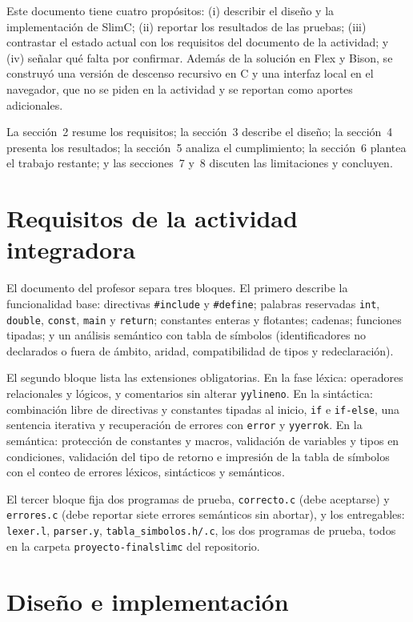 \documentclass[runningheads]{llncs}
\begin{document}
Este documento tiene cuatro propósitos: (i) describir el diseño y la implementación de SlimC; (ii) reportar los resultados de las pruebas; (iii) contrastar el estado actual con los requisitos del documento de la actividad; y (iv) señalar qué falta por confirmar. Además de la solución en Flex y Bison, se construyó una versión de descenso recursivo en C y una interfaz local en el navegador, que no se piden en la actividad y se reportan como aportes adicionales.

La sección~2 resume los requisitos; la sección~3 describe el diseño; la sección~4 presenta los resultados; la sección~5 analiza el cumplimiento; la sección~6 plantea el trabajo restante; y las secciones~7 y~8 discuten las limitaciones y concluyen.

\section{Requisitos de la actividad integradora}
El documento del profesor separa tres bloques. El primero describe la funcionalidad base: directivas \texttt{\#include} y \texttt{\#define}; palabras reservadas \texttt{int}, \texttt{double}, \texttt{const}, \texttt{main} y \texttt{return}; constantes enteras y flotantes; cadenas; funciones tipadas; y un análisis semántico con tabla de símbolos (identificadores no declarados o fuera de ámbito, aridad, compatibilidad de tipos y redeclaración).

El segundo bloque lista las extensiones obligatorias. En la fase léxica: operadores relacionales y lógicos, y comentarios sin alterar \texttt{yylineno}. En la sintáctica: combinación libre de directivas y constantes tipadas al inicio, \texttt{if} e \texttt{if-else}, una sentencia iterativa y recuperación de errores con \texttt{error} y \texttt{yyerrok}. En la semántica: protección de constantes y macros, validación de variables y tipos en condiciones, validación del tipo de retorno e impresión de la tabla de símbolos con el conteo de errores léxicos, sintácticos y semánticos.

El tercer bloque fija dos programas de prueba, \texttt{correcto.c} (debe aceptarse) y \texttt{errores.c} (debe reportar siete errores semánticos sin abortar), y los entregables: \texttt{lexer.l}, \texttt{parser.y}, \texttt{tabla\_simbolos.h/.c}, los dos programas de prueba, todos en la carpeta \texttt{proyecto-finalslimc} del repositorio.

\section{Diseño e implementación}
\end{document}
